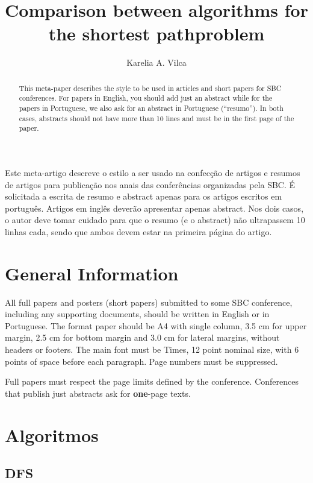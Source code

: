 \documentclass[12pt]{article}
\title{Comparison between algorithms for the shortest pathproblem\\ }
\author{Karelia A. Vilca\inst{1}}
\begin{document}
 

\maketitle

\begin{abstract}
  This meta-paper describes the style to be used in articles and short papers
  for SBC conferences. For papers in English, you should add just an abstract
  while for the papers in Portuguese, we also ask for an abstract in
  Portuguese (``resumo''). In both cases, abstracts should not have more than
  10 lines and must be in the first page of the paper.
\end{abstract}
     
\begin{resumo} 
  Este meta-artigo descreve o estilo a ser usado na confecção de artigos e
  resumos de artigos para publicação nos anais das conferências organizadas
  pela SBC. É solicitada a escrita de resumo e abstract apenas para os artigos
  escritos em português. Artigos em inglês deverão apresentar apenas abstract.
  Nos dois casos, o autor deve tomar cuidado para que o resumo (e o abstract)
  não ultrapassem 10 linhas cada, sendo que ambos devem estar na primeira
  página do artigo.
\end{resumo}


\section{General Information}

All full papers and posters (short papers) submitted to some SBC conference,
including any supporting documents, should be written in English or in
Portuguese. The format paper should be A4 with single column, 3.5 cm for upper
margin, 2.5 cm for bottom margin and 3.0 cm for lateral margins, without
headers or footers. The main font must be Times, 12 point nominal size, with 6
points of space before each paragraph. Page numbers must be suppressed.

Full papers must respect the page limits defined by the conference.
Conferences that publish just abstracts ask for \textbf{one}-page texts.


\section{Algoritmos}

\subsection{DFS}
\cite{tarjan1972depth}

\end{document}
